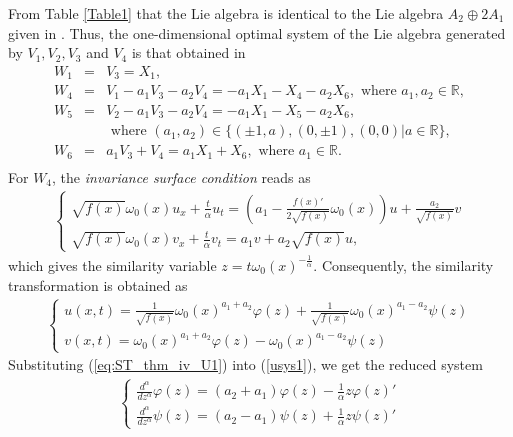 \documentclass[12pt]{amsart}
\begin{document}
From Table \ref{Table1} that the Lie algebra is identical to the Lie algebra $A_2\oplus 2A_1$ given in \cite{PateraWinternitz1977}. 
Thus, the one-dimensional optimal system of the Lie algebra generated by $V_1 , V_2, V_3$ and $V_4$ is that obtained in 
\cite{PateraWinternitz1977}
\begin{eqnarray*}
\label{ivU1}
W_1 & = & V_3=X_1,\\
W_4 & = & V_1- a_1 V_3-a_2 V_4=-a_1X_1-X_4-a_2X_6, \text{ where } a_1,a_2\in\mathbb{R},\\
\label{ivU2}
W_5 & = & V_2-a_1 V_3-a_2 V_4=-a_1X_1-X_5-a_2X_6,\\
&&\text{ where }  (a_1, a_2)\in\{(\pm 1,a), (0,\pm 1), (0,0)|a\in\mathbb{R}\},\\
\label{ivU3}
W_6 & = & a_1 V_3+ V_4=a_1X_1+X_6, \text{ where } a_1\in\mathbb{R}.\\
\label{ivU4}
\end{eqnarray*}
For $W_4$, the \textit{invariance surface condition} reads as
\begin{eqnarray}
\begin{cases}
\sqrt{f(x)}\omega_{0}(x)u_x+\frac{t}{\alpha}u_t=
\left(a_1-\frac{f(x)'}{2\sqrt{f(x)}}\omega_{0}(x) \right) u+\frac{a_2}{\sqrt{f(x)}}v\\
\sqrt{f(x)}\omega_{0}(x) v_x+\frac{t}{\alpha}v_t=
a_1v+a_2\sqrt{f(x)}u,
\end{cases}
\end{eqnarray}
which gives the similarity variable
$z=t\omega_{0}(x)^{-\frac{1}{\alpha}}
$. Consequently, the similarity transformation is obtained as
\begin{eqnarray}
\label{eq:ST_thm_iv_U1}
\begin{cases}
u(x,t)=\frac{1}{\sqrt{f(x)}}\omega_{0}(x)^{a_1+a_2}\varphi(z)+\frac{1}{\sqrt{f(x)}}\omega_{0}(x)^{a_1-a_2}\psi(z)\\
v(x,t)=\omega_{0}(x)^{a_1+a_2}\varphi(z)-\omega_{0}(x)^{a_1-a_2}\psi(z)
\end{cases}
\end{eqnarray}
Substituting (\ref{eq:ST_thm_iv_U1}) into (\ref{usys1}), we get the reduced system
\begin{eqnarray}
\label{eq:BU1ODE}
\begin{cases}
\frac{d^{\alpha}}{dz^{\alpha}}\varphi(z)=(a_2+a_1)\varphi(z) -\frac{1}{\alpha}z\varphi(z)'\\
\frac{d^{\alpha}}{dz^{\alpha}}\psi(z)=(a_2-a_1)\psi(z) +\frac{1}{\alpha}z\psi(z)'
\end{cases}
\end{eqnarray}
\end{document}
